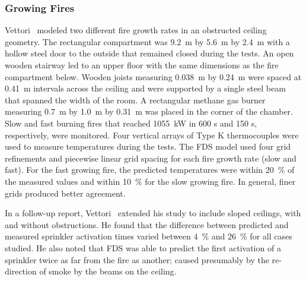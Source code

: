 \subsubsection{Growing Fires}
\label{growingfires}

Vettori~\cite{Vettori:1} modeled two different fire growth rates in an obstructed ceiling geometry.  The rectangular compartment was 9.2~m by 5.6~m
by 2.4~m  with a hollow steel door to  the outside that remained closed during the tests. An open wooden stairway led to an upper floor with the same
dimensions as the fire compartment below.  Wooden joists measuring 0.038~m by 0.24~m were spaced at 0.41~m intervals across the ceiling and  were
supported  by a single  steel beam that  spanned the width of the  room.  A rectangular methane gas  burner measuring 0.7~m by 1.0~m by 0.31~m was
placed  in the corner of the chamber.  Slow and fast  burning  fires  that  reached  1055~kW  in  600  s  and  150  s, respectively,  were
monitored.   Four   vertical  arrays  of  Type  K thermocouples were used to measure temperatures during the tests.  The FDS model used four grid
refinements and piecewise linear grid spacing for each fire growth rate (slow  and fast). For the fast growing fire, the predicted  temperatures were
within  20~\% of the  measured values and within  10~\% for the slow  growing fire. In  general, finer grids produced better agreement.

In a follow-up report,  Vettori~\cite{Vettori:2} extended his study to include sloped ceilings, with  and without obstructions. He found that the
difference between  predicted and  measured  sprinkler activation times varied  between 4~\%  and 26~\% for  all cases studied.  He also noted that
FDS was able to predict the first activation of a sprinkler twice  as far  from  the fire  as  another; caused  presumably by  the re-direction of
smoke by the beams on the ceiling.

